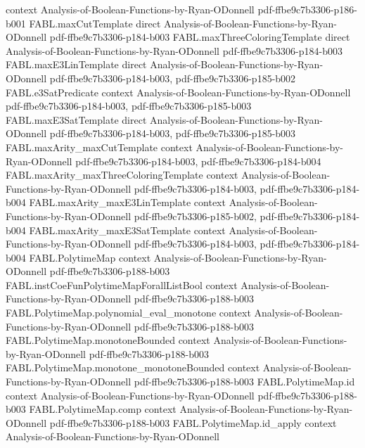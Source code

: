 \begin{theorem}
  {context}
  {Analysis-of-Boolean-Functions-by-Ryan-ODonnell}
  {pdf-ffbe9c7b3306-p186-b001}
\proofstep
  {FABL.maxCutTemplate}
  {direct}
  {Analysis-of-Boolean-Functions-by-Ryan-ODonnell}
  {pdf-ffbe9c7b3306-p184-b003}
\proofstep
  {FABL.maxThreeColoringTemplate}
  {direct}
  {Analysis-of-Boolean-Functions-by-Ryan-ODonnell}
  {pdf-ffbe9c7b3306-p184-b003}
\proofstep
  {FABL.maxE3LinTemplate}
  {direct}
  {Analysis-of-Boolean-Functions-by-Ryan-ODonnell}
  {pdf-ffbe9c7b3306-p184-b003,
    pdf-ffbe9c7b3306-p185-b002}
\proofstep
  {FABL.e3SatPredicate}
  {context}
  {Analysis-of-Boolean-Functions-by-Ryan-ODonnell}
  {pdf-ffbe9c7b3306-p184-b003,
    pdf-ffbe9c7b3306-p185-b003}
\proofstep
  {FABL.maxE3SatTemplate}
  {direct}
  {Analysis-of-Boolean-Functions-by-Ryan-ODonnell}
  {pdf-ffbe9c7b3306-p184-b003,
    pdf-ffbe9c7b3306-p185-b003}
\proofstep
  {FABL.maxArity_maxCutTemplate}
  {context}
  {Analysis-of-Boolean-Functions-by-Ryan-ODonnell}
  {pdf-ffbe9c7b3306-p184-b003,
    pdf-ffbe9c7b3306-p184-b004}
\proofstep
  {FABL.maxArity_maxThreeColoringTemplate}
  {context}
  {Analysis-of-Boolean-Functions-by-Ryan-ODonnell}
  {pdf-ffbe9c7b3306-p184-b003,
    pdf-ffbe9c7b3306-p184-b004}
\proofstep
  {FABL.maxArity_maxE3LinTemplate}
  {context}
  {Analysis-of-Boolean-Functions-by-Ryan-ODonnell}
  {pdf-ffbe9c7b3306-p185-b002,
    pdf-ffbe9c7b3306-p184-b004}
\proofstep
  {FABL.maxArity_maxE3SatTemplate}
  {context}
  {Analysis-of-Boolean-Functions-by-Ryan-ODonnell}
  {pdf-ffbe9c7b3306-p184-b003,
    pdf-ffbe9c7b3306-p184-b004}
\proofstep
  {FABL.PolytimeMap}
  {context}
  {Analysis-of-Boolean-Functions-by-Ryan-ODonnell}
  {pdf-ffbe9c7b3306-p188-b003}
\proofstep
  {FABL.instCoeFunPolytimeMapForallListBool}
  {context}
  {Analysis-of-Boolean-Functions-by-Ryan-ODonnell}
  {pdf-ffbe9c7b3306-p188-b003}
\proofstep
  {FABL.PolytimeMap.polynomial_eval_monotone}
  {context}
  {Analysis-of-Boolean-Functions-by-Ryan-ODonnell}
  {pdf-ffbe9c7b3306-p188-b003}
\proofstep
  {FABL.PolytimeMap.monotoneBounded}
  {context}
  {Analysis-of-Boolean-Functions-by-Ryan-ODonnell}
  {pdf-ffbe9c7b3306-p188-b003}
\proofstep
  {FABL.PolytimeMap.monotone_monotoneBounded}
  {context}
  {Analysis-of-Boolean-Functions-by-Ryan-ODonnell}
  {pdf-ffbe9c7b3306-p188-b003}
\proofstep
  {FABL.PolytimeMap.id}
  {context}
  {Analysis-of-Boolean-Functions-by-Ryan-ODonnell}
  {pdf-ffbe9c7b3306-p188-b003}
\proofstep
  {FABL.PolytimeMap.comp}
  {context}
  {Analysis-of-Boolean-Functions-by-Ryan-ODonnell}
  {pdf-ffbe9c7b3306-p188-b003}
\proofstep
  {FABL.PolytimeMap.id_apply}
  {context}
  {Analysis-of-Boolean-Functions-by-Ryan-ODonnell}

\end{theorem}
